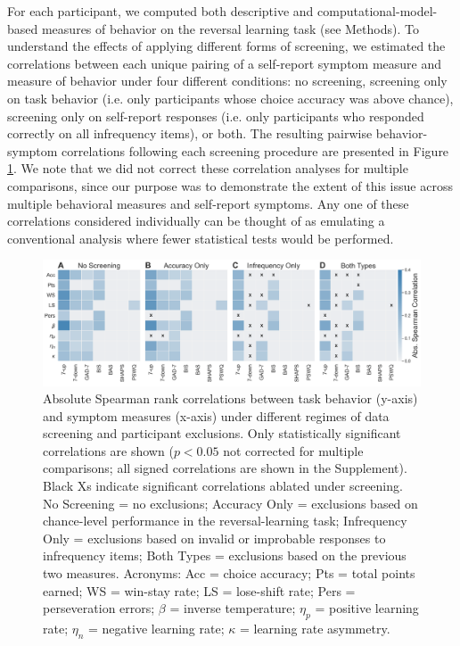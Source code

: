 \documentclass[a4paper,notitlepage,12pt]{article}
\begin{document}
\begin{refsection}[main]
For each participant, we computed both descriptive and computational-model-based measures of behavior on the reversal learning task (see Methods). To understand the effects of applying different forms of screening, we estimated the correlations between each unique pairing of a self-report symptom measure and measure of behavior under four different conditions: no screening, screening only on task behavior (i.e. only participants whose choice accuracy was above chance), screening only on self-report responses (i.e. only participants who responded correctly on all infrequency items), or both. The resulting pairwise behavior-symptom correlations following each screening procedure are presented in Figure \ref{fig:correlations}. We note that we did not correct these correlation analyses for multiple comparisons, since our purpose was to demonstrate the extent of this issue across multiple behavioral measures and self-report symptoms. Any one of these correlations considered individually can be thought of as emulating a conventional analysis where fewer statistical tests would be performed.

\begin{figure}[!t]
\includegraphics[width=17cm]{../figures/main_03a.png}
\centering
\captionsetup{width=0.88\textwidth}
\caption{Absolute Spearman rank correlations between task behavior (y-axis) and symptom measures (x-axis) under different regimes of data screening and participant exclusions. Only statistically significant correlations are shown ($p<0.05$ not corrected for multiple comparisons; all signed correlations are shown in the Supplement). Black Xs indicate significant correlations ablated under screening. No Screening = no exclusions; Accuracy Only = exclusions based on chance-level performance in the reversal-learning task; Infrequency Only = exclusions based on invalid or improbable responses to infrequency items; Both Types = exclusions based on the previous two measures. Acronyms: Acc = choice accuracy; Pts = total points earned; WS = win-stay rate; LS = lose-shift rate; Pers = perseveration errors; $\beta$ = inverse temperature; $\eta_p$ = positive learning rate; $\eta_n$ = negative learning rate; $\kappa$ = learning rate asymmetry.}
\label{fig:correlations}
\end{figure}


\end{refsection}
\end{document}
